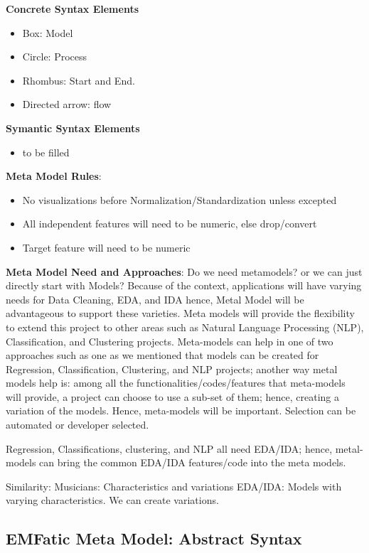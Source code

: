 \textbf{Concrete  Syntax Elements}
\begin{itemize}
	\item Box: Model
	\item Circle: Process
	\item Rhombus: Start and End.
	\item Directed arrow: flow
\end{itemize}

\textbf{Symantic  Syntax Elements}
\begin{itemize}
	\item to be filled
\end{itemize}

\textbf{Meta Model Rules}:
\begin{itemize}
	\item No visualizations before Normalization/Standardization unless excepted
	\item All independent features will need to be numeric, else drop/convert
	\item Target feature will need to be numeric
\end{itemize}

\textbf{Meta Model Need and Approaches}:
\flushleft \justify Do we need metamodels? or we can just directly start with Models? Because of the context, applications will have varying needs for Data Cleaning, EDA, and IDA hence, Metal Model will be advantageous to support these varieties. Meta models will provide the flexibility to extend this project to other areas such as Natural Language Processing (NLP), Classification, and Clustering projects. Meta-models can help in one of two approaches such as one as we mentioned that models can be created for Regression, Classification, Clustering, and NLP projects; another way metal models help is: among all the functionalities/codes/features that meta-models will provide, a project can choose to use a sub-set of them; hence, creating a variation of the models. Hence, meta-models will be important. Selection can be automated or developer selected.

\flushleft \justify Regression, Classifications, clustering, and NLP all need EDA/IDA; hence, metal-models can bring the common EDA/IDA features/code into the meta models. 

\flushleft \justify Similarity:
\flushleft \justify Musicians: Characteristics  and variations
\flushleft \justify EDA/IDA: Models with varying characteristics. We can create variations.


\subsection{EMFatic Meta Model: Abstract Syntax}

